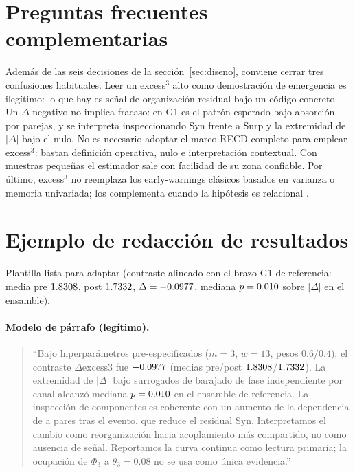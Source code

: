 \documentclass[11pt,a4paper]{article}
\begin{document}
\section{Preguntas frecuentes complementarias}
\label{sec:faq}

Adem\'as de las seis decisiones de la secci\'on~\ref{sec:diseno}, conviene
cerrar tres confusiones habituales. Leer un excess$^3$ alto como
demostraci\'on de emergencia es ileg\'itimo: lo que hay es se\~nal de
organizaci\'on residual bajo un c\'odigo concreto. Un $\Delta$ negativo no
implica fracaso: en G1 es el patr\'on esperado bajo absorci\'on por parejas,
y se interpreta inspeccionando Syn frente a Surp y la extremidad de
$|\Delta|$ bajo el nulo. No es necesario adoptar el marco RECD completo
para emplear excess$^3$: bastan definici\'on operativa, nulo e
interpretaci\'on contextual. Con muestras peque\~nas el estimador sale con
facilidad de su zona confiable. Por \'ultimo, excess$^3$ no reemplaza los
early-warnings cl\'asicos basados en varianza o memoria univariada; los
complementa cuando la hip\'otesis es relacional \citep{Scheffer2009}.

\section{Ejemplo de redacci\'on de resultados}
\label{sec:narracion}

Plantilla lista para adaptar (contraste alineado con el brazo G1 de
referencia: media pre $1.8308$, post $1.7332$,
$\Delta=-0.0977$, mediana $p=0.010$ sobre $|\Delta|$ en el ensamble).

\paragraph{Modelo de p\'arrafo (leg\'itimo).}
\begin{quote}
\small\raggedright
``Bajo hiperpar\'ametros pre-especificados ($m{=}3$, $w{=}13$, pesos
$0.6/0.4$), el contraste $\Delta\mathrm{excess3}$ fue $-0.0977$
(medias pre/post $1.8308$/$1.7332$).
La extremidad de $|\Delta|$ bajo surrogados de barajado de fase
independiente por canal alcanz\'o mediana $p=0.010$ en el ensamble de
referencia.
La inspecci\'on de componentes es coherente con un aumento de la
dependencia de a pares tras el evento, que reduce el residual
$\mathrm{Syn}$.
Interpretamos el cambio como reorganizaci\'on hacia acoplamiento m\'as
compartido, no como ausencia de se\~nal.
Reportamos la curva continua como lectura primaria; la ocupaci\'on de
$\Phi_3$ a $\theta_3{=}0.08$ no se usa como \'unica evidencia.''
\end{quote}
\end{document}
